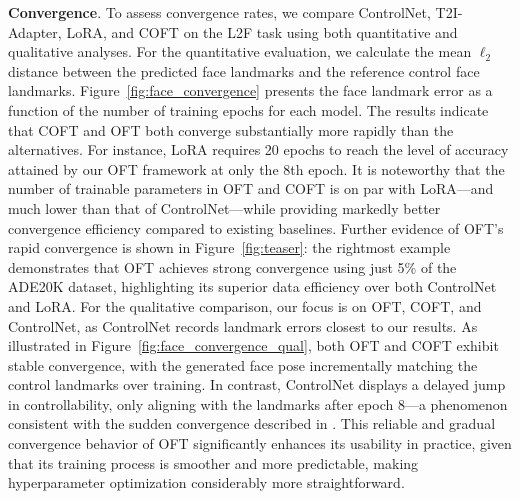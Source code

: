 \textbf{Convergence}. To assess convergence rates, we compare ControlNet, T2I-Adapter, LoRA, and COFT on the L2F task using both quantitative and qualitative analyses. For the quantitative evaluation, we calculate the mean $\ell_2$ distance between the predicted face landmarks and the reference control face landmarks. Figure~\ref{fig:face_convergence} presents the face landmark error as a function of the number of training epochs for each model. The results indicate that COFT and OFT both converge substantially more rapidly than the alternatives. For instance, LoRA requires 20 epochs to reach the level of accuracy attained by our OFT framework at only the 8th epoch. It is noteworthy that the number of trainable parameters in OFT and COFT is on par with LoRA—and much lower than that of ControlNet—while providing markedly better convergence efficiency compared to existing baselines. Further evidence of OFT’s rapid convergence is shown in Figure~\ref{fig:teaser}: the rightmost example demonstrates that OFT achieves strong convergence using just 5\% of the ADE20K dataset, highlighting its superior data efficiency over both ControlNet and LoRA. For the qualitative comparison, our focus is on OFT, COFT, and ControlNet, as ControlNet records landmark errors closest to our results. As illustrated in Figure~\ref{fig:face_convergence_qual}, both OFT and COFT exhibit stable convergence, with the generated face pose incrementally matching the control landmarks over training. In contrast, ControlNet displays a delayed jump in controllability, only aligning with the landmarks after epoch 8—a phenomenon consistent with the sudden convergence described in \cite{zhang2023adding}. This reliable and gradual convergence behavior of OFT significantly enhances its usability in practice, given that its training process is smoother and more predictable, making hyperparameter optimization considerably more straightforward.

